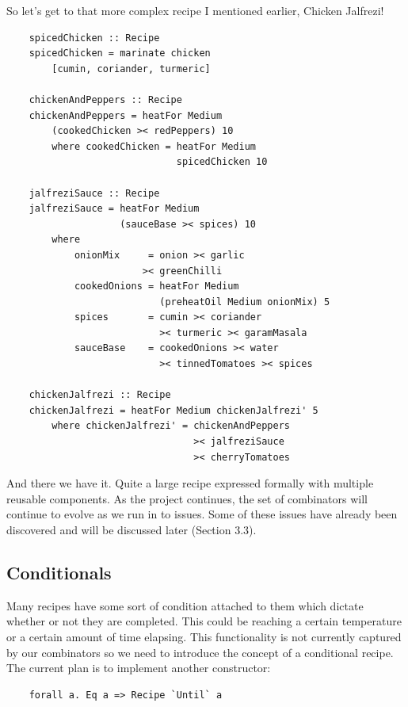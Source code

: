\documentclass[11pt]{article}
\begin{document}
    So let's get to that more complex recipe I mentioned earlier, Chicken Jalfrezi!
    \begin{tt}
    \small
    \begin{lstlisting}
    spicedChicken :: Recipe
    spicedChicken = marinate chicken
        [cumin, coriander, turmeric]

    chickenAndPeppers :: Recipe
    chickenAndPeppers = heatFor Medium
        (cookedChicken >< redPeppers) 10
        where cookedChicken = heatFor Medium
                              spicedChicken 10

    jalfreziSauce :: Recipe
    jalfreziSauce = heatFor Medium
                    (sauceBase >< spices) 10
        where
            onionMix     = onion >< garlic
                        >< greenChilli
            cookedOnions = heatFor Medium
                           (preheatOil Medium onionMix) 5
            spices       = cumin >< coriander
                           >< turmeric >< garamMasala
            sauceBase    = cookedOnions >< water
                           >< tinnedTomatoes >< spices

    chickenJalfrezi :: Recipe
    chickenJalfrezi = heatFor Medium chickenJalfrezi' 5
        where chickenJalfrezi' = chickenAndPeppers
                                 >< jalfreziSauce
                                 >< cherryTomatoes
    \end{lstlisting}
    \end{tt}
    And there we have it. Quite a large recipe expressed formally with
    multiple reusable components. As the project continues, the set of
    combinators will continue to evolve as we run in to issues. Some of
    these issues have already been discovered and will be discussed later
    (Section 3.3).

    \subsection{Conditionals}

    Many recipes have some sort of condition attached to them which dictate
    whether or not they are completed. This could be reaching a certain
    temperature or a certain amount of time elapsing. This functionality
    is not currently captured by our combinators so we need to introduce
    the concept of a conditional recipe. The current plan is to implement
    another constructor:

    \begin{tt}
    \small
    \begin{lstlisting}
    forall a. Eq a => Recipe `Until` a
    \end{lstlisting}
    \end{tt}
\end{document}
